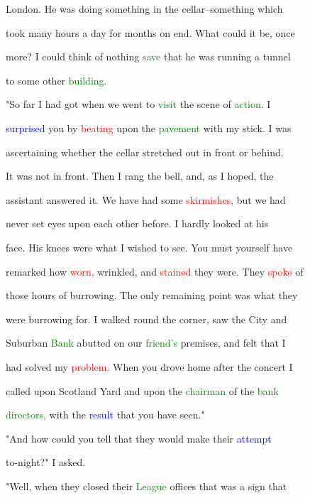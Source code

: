  London. He was doing something in the cellar--something which

 took many hours a day for months on end. What could it be, once

 more? I could think of nothing \textcolor{green}{save} that he was running a tunnel

 to some other \textcolor{green}{building.}



 "So far I had got when we went to \textcolor{green}{visit} the scene of \textcolor{green}{action.} I

 \textcolor{blue}{surprised} you by \textcolor{red}{beating} upon the \textcolor{green}{pavement} with my stick. I was

 ascertaining whether the cellar stretched out in front or behind.

 It was not in front. Then I rang the bell, and, as I hoped, the

 assistant answered it. We have had some \textcolor{red}{skirmishes,} but we had

 never set eyes upon each other before. I hardly looked at his

 face. His knees were what I wished to see. You must yourself have

 remarked how \textcolor{red}{worn,} wrinkled, and \textcolor{red}{stained} they were. They \textcolor{red}{spoke} of

 those hours of burrowing. The only remaining point was what they

 were burrowing for. I walked round the corner, saw the City and

 Suburban \textcolor{green}{Bank} abutted on our \textcolor{green}{friend's} premises, and felt that I

 had solved my \textcolor{red}{problem.} When you drove home after the concert I

 called upon Scotland Yard and upon the \textcolor{green}{chairman} of the \textcolor{green}{bank}

 \textcolor{green}{directors,} with the \textcolor{blue}{result} that you have seen."



 "And how could you tell that they would make their \textcolor{blue}{attempt}

 to-night?" I asked.



 "Well, when they closed their \textcolor{green}{League} offices that was a sign that

